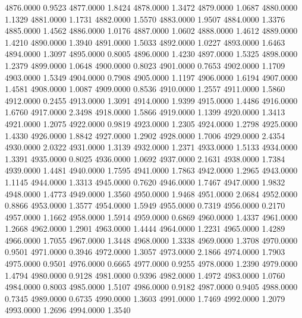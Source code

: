4876.0000      0.9523
4877.0000      1.8424
4878.0000      1.3472
4879.0000      1.0687
4880.0000      1.1329
4881.0000      1.1731
4882.0000      1.5570
4883.0000      1.9507
4884.0000      1.3376
4885.0000      1.4562
4886.0000      1.0176
4887.0000      1.0602
4888.0000      1.4612
4889.0000      1.4210
4890.0000      1.3940
4891.0000      1.5033
4892.0000      1.0227
4893.0000      1.6463
4894.0000      1.3097
4895.0000      0.8005
4896.0000      1.4230
4897.0000      1.5325
4898.0000      1.2379
4899.0000      1.0648
4900.0000      0.8023
4901.0000      0.7653
4902.0000      1.1709
4903.0000      1.5349
4904.0000      0.7908
4905.0000      1.1197
4906.0000      1.6194
4907.0000      1.4581
4908.0000      1.0087
4909.0000      0.8536
4910.0000      1.2557
4911.0000      1.5860
4912.0000      0.2455
4913.0000      1.3091
4914.0000      1.9399
4915.0000      1.4486
4916.0000      1.6760
4917.0000      2.3498
4918.0000      1.5866
4919.0000      1.1399
4920.0000      1.3413
4921.0000      1.2075
4922.0000      0.9819
4923.0000      1.2305
4924.0000      1.2798
4925.0000      1.4330
4926.0000      1.8842
4927.0000      1.2902
4928.0000      1.7006
4929.0000      2.4354
4930.0000      2.0322
4931.0000      1.3139
4932.0000      1.2371
4933.0000      1.5133
4934.0000      1.3391
4935.0000      0.8025
4936.0000      1.0692
4937.0000      2.1631
4938.0000      1.7384
4939.0000      1.4481
4940.0000      1.7595
4941.0000      1.7863
4942.0000      1.2965
4943.0000      1.1145
4944.0000      1.3313
4945.0000      0.7620
4946.0000      1.7467
4947.0000      1.9832
4948.0000      1.4773
4949.0000      1.3560
4950.0000      1.9468
4951.0000      2.0684
4952.0000      0.8866
4953.0000      1.3577
4954.0000      1.5949
4955.0000      0.7319
4956.0000      0.2170
4957.0000      1.1662
4958.0000      1.5914
4959.0000      0.6869
4960.0000      1.4337
4961.0000      1.2668
4962.0000      1.2901
4963.0000      1.4444
4964.0000      1.2231
4965.0000      1.4289
4966.0000      1.7055
4967.0000      1.3448
4968.0000      1.3338
4969.0000      1.3708
4970.0000      0.9501
4971.0000      0.3946
4972.0000      1.3057
4973.0000      2.1866
4974.0000      1.7903
4975.0000      0.9501
4976.0000      0.6665
4977.0000      0.9255
4978.0000      1.2390
4979.0000      1.4794
4980.0000      0.9128
4981.0000      0.9396
4982.0000      1.4972
4983.0000      1.0760
4984.0000      0.8003
4985.0000      1.5107
4986.0000      0.9182
4987.0000      0.9405
4988.0000      0.7345
4989.0000      0.6735
4990.0000      1.3603
4991.0000      1.7469
4992.0000      1.2079
4993.0000      1.2696
4994.0000      1.3540
